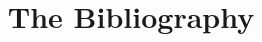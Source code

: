\documentclass[12pt]{article}
\title{The Bibliography}
\author{}
\begin{document}
\maketitle
\nocite{*}


\end{document}
